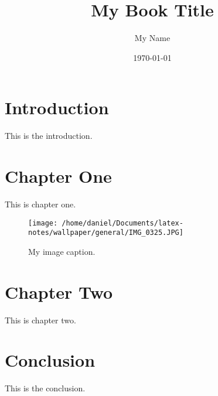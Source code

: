 \documentclass{book}
\begin{document}
\frontmatter
\title{My Book Title}
\author{My Name}
\date{\today}
\maketitle

\tableofcontents

\chapter{Introduction}
This is the introduction.

\lipsum

\mainmatter

\lipsum
\chapter{Chapter One}
This is chapter one.

\lipsum
\begin{figure}[ht]
\centering
\texttt{[image: /home/daniel/Documents/latex-notes/wallpaper/general/IMG\_0325.JPG]}
\caption{My image caption.}
\label{fig:myimage}
\end{figure}

\lipsum
\chapter{Chapter Two}
This is chapter two.

\lipsum
\backmatter

\lipsum
\chapter{Conclusion}
This is the conclusion.

\lipsum
\end{document}
